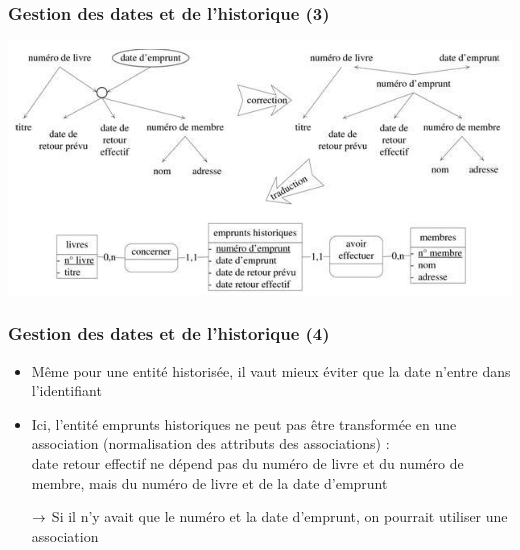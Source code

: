 \begin{frame}
  \frametitle{Gestion des dates et de l'historique (3)}
  \begin{center}
    \includegraphics[width=0.9\linewidth]{gestion_historique.jpg}
  \end{center}
\end{frame}

\begin{frame}
  \frametitle{Gestion des dates et de l'historique (4)}
  \begin{itemize}
    \item Même pour une entité historisée, il vaut mieux éviter que la date n'entre dans l'identifiant
    \item Ici, l'entité emprunts historiques ne peut pas être transformée en une association (normalisation
      des attributs des associations) :\\ date retour effectif ne dépend pas du numéro de livre et du numéro de membre, mais du numéro de livre et de la date
      d'emprunt
    \item[$\rightarrow$] Si il n'y avait que le numéro et la date d'emprunt, on pourrait
        utiliser une association
  \end{itemize}
\end{frame}

